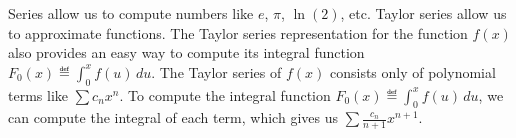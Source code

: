 		Series allow us to compute numbers like $e$, $\pi$, $\ln(2)$, etc.
		Taylor series allow us to approximate functions.
		The Taylor series representation for the function $f(x)$
		also provides an easy way
		to compute its integral function $F_0(x) \eqdef \int_0^x f(u)\,du$.
		The Taylor series of $f(x)$ consists only of polynomial terms like $\sum c_n x^n$.
		To compute the integral function $F_0(x) \eqdef \int_0^x f(u)\,du$,
		we can compute the integral of each term,
		which gives us $\sum \frac{c_n}{n+1}x^{n+1}$.







